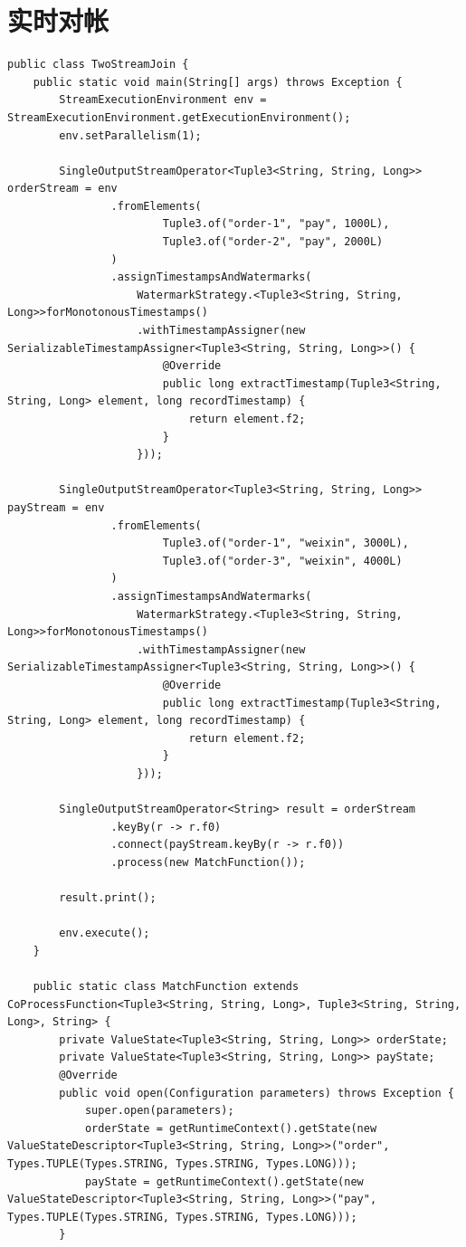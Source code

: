 \documentclass[cn,11pt,chinese]{elegantbook}
\begin{document}
\section{实时对帐}

\begin{verbatim}
public class TwoStreamJoin {
    public static void main(String[] args) throws Exception {
        StreamExecutionEnvironment env = StreamExecutionEnvironment.getExecutionEnvironment();
        env.setParallelism(1);

        SingleOutputStreamOperator<Tuple3<String, String, Long>> orderStream = env
                .fromElements(
                        Tuple3.of("order-1", "pay", 1000L),
                        Tuple3.of("order-2", "pay", 2000L)
                )
                .assignTimestampsAndWatermarks(
                    WatermarkStrategy.<Tuple3<String, String, Long>>forMonotonousTimestamps()
                    .withTimestampAssigner(new SerializableTimestampAssigner<Tuple3<String, String, Long>>() {
                        @Override
                        public long extractTimestamp(Tuple3<String, String, Long> element, long recordTimestamp) {
                            return element.f2;
                        }
                    }));

        SingleOutputStreamOperator<Tuple3<String, String, Long>> payStream = env
                .fromElements(
                        Tuple3.of("order-1", "weixin", 3000L),
                        Tuple3.of("order-3", "weixin", 4000L)
                )
                .assignTimestampsAndWatermarks(
                    WatermarkStrategy.<Tuple3<String, String, Long>>forMonotonousTimestamps()
                    .withTimestampAssigner(new SerializableTimestampAssigner<Tuple3<String, String, Long>>() {
                        @Override
                        public long extractTimestamp(Tuple3<String, String, Long> element, long recordTimestamp) {
                            return element.f2;
                        }
                    }));

        SingleOutputStreamOperator<String> result = orderStream
                .keyBy(r -> r.f0)
                .connect(payStream.keyBy(r -> r.f0))
                .process(new MatchFunction());

        result.print();

        env.execute();
    }

    public static class MatchFunction extends CoProcessFunction<Tuple3<String, String, Long>, Tuple3<String, String, Long>, String> {
        private ValueState<Tuple3<String, String, Long>> orderState;
        private ValueState<Tuple3<String, String, Long>> payState;
        @Override
        public void open(Configuration parameters) throws Exception {
            super.open(parameters);
            orderState = getRuntimeContext().getState(new ValueStateDescriptor<Tuple3<String, String, Long>>("order", Types.TUPLE(Types.STRING, Types.STRING, Types.LONG)));
            payState = getRuntimeContext().getState(new ValueStateDescriptor<Tuple3<String, String, Long>>("pay", Types.TUPLE(Types.STRING, Types.STRING, Types.LONG)));
        }


\end{verbatim}
\end{document}
